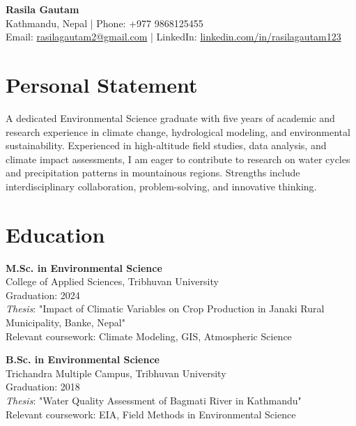\documentclass[a4paper,10pt]{article}
\begin{document}
\begin{center}
    {\LARGE \textbf{Rasila Gautam}} \\
    Kathmandu, Nepal | Phone: +977 9868125455 \\
    Email: \href{mailto:rasilagautam2@gmail.com}{rasilagautam2@gmail.com} | LinkedIn: \href{https://linkedin.com/in/rasilagautam123}{linkedin.com/in/rasilagautam123}
\end{center}

\vspace{0.2cm}

\section*{Personal Statement}
A dedicated Environmental Science graduate with five years of academic and research experience in climate change, hydrological modeling, and environmental sustainability. Experienced in high-altitude field studies, data analysis, and climate impact assessments, I am eager to contribute to research on water cycles and precipitation patterns in mountainous regions. Strengths include interdisciplinary collaboration, problem-solving, and innovative thinking.

\vspace{0.2cm}

\section*{Education}
\begin{multicols}{2}

\noindent
\textbf{M.Sc. in Environmental Science} \\
College of Applied Sciences, Tribhuvan University \\
Graduation: 2024 \\
\textit{Thesis}: "Impact of Climatic Variables on Crop Production in Janaki Rural Municipality, Banke, Nepal" \\
Relevant coursework: Climate Modeling, GIS, Atmospheric Science

\vspace{0.2cm}

\noindent
\textbf{B.Sc. in Environmental Science} \\
Trichandra Multiple Campus, Tribhuvan University \\
Graduation: 2018 \\
\textit{Thesis}: "Water Quality Assessment of Bagmati River in Kathmandu" \\
Relevant coursework: EIA, Field Methods in Environmental Science

\vspace{0.2cm}

\end{multicols}
\end{document}
